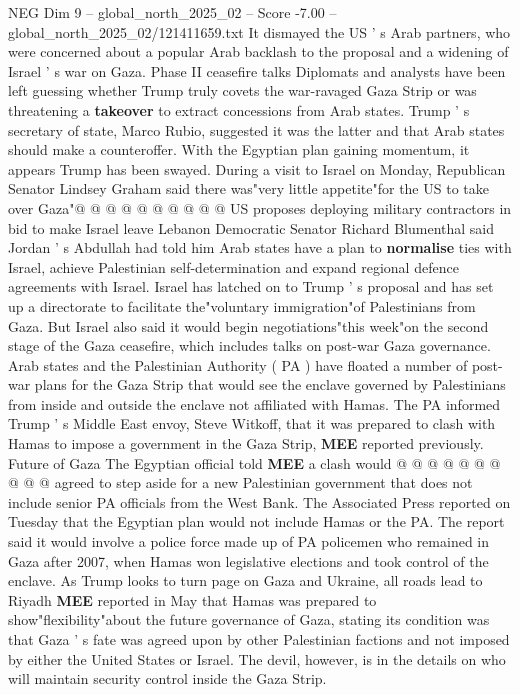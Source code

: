 \begin{textsample}{NEG Dim 9 – global\_north\_2025\_02 – Score -7.00 – global\_north\_2025\_02/121411659.txt}
It dismayed the US ' s Arab partners, who were concerned about a popular Arab backlash to the proposal and a widening of Israel ' s war on Gaza.
Phase II ceasefire talks Diplomats and analysts have been left guessing whether Trump truly covets the war-ravaged Gaza Strip or was threatening a \textbf{takeover} to extract concessions from Arab states.
Trump ' s secretary of state, Marco Rubio, suggested it was the latter and that Arab states should make a counteroffer.
With the Egyptian plan gaining momentum, it appears Trump has been swayed.
During a visit to Israel on Monday, Republican Senator Lindsey Graham said there was"very little appetite"for the US to take over Gaza"@ @ @ @ @ @ @ @ @ @ US proposes deploying military contractors in bid to make Israel leave Lebanon Democratic Senator Richard Blumenthal said Jordan ' s Abdullah had told him Arab states have a plan to \textbf{normalise} ties with Israel, achieve Palestinian self-determination and expand regional defence agreements with Israel.
Israel has latched on to Trump ' s proposal and has set up a directorate to facilitate the"voluntary immigration"of Palestinians from Gaza.
But Israel also said it would begin negotiations"this week"on the second stage of the Gaza ceasefire, which includes talks on post-war Gaza governance.
Arab states and the Palestinian Authority ( PA ) have floated a number of post-war plans for the Gaza Strip that would see the enclave governed by Palestinians from inside and outside the enclave not affiliated with Hamas.
The PA informed Trump ' s Middle East envoy, Steve Witkoff, that it was prepared to clash with Hamas to impose a government in the Gaza Strip, \textbf{MEE} reported previously.
Future of Gaza The Egyptian official told \textbf{MEE} a clash would @ @ @ @ @ @ @ @ @ @ agreed to step aside for a new Palestinian government that does not include senior PA officials from the West Bank.
The Associated Press reported on Tuesday that the Egyptian plan would not include Hamas or the PA.
The report said it would involve a police force made up of PA policemen who remained in Gaza after 2007, when Hamas won legislative elections and took control of the enclave.
As Trump looks to turn page on Gaza and Ukraine, all roads lead to Riyadh \textbf{MEE} reported in May that Hamas was prepared to show"flexibility"about the future governance of Gaza, stating its condition was that Gaza ' s fate was agreed upon by other Palestinian factions and not imposed by either the United States or Israel.
The devil, however, is in the details on who will maintain security control inside the Gaza Strip.

\end{textsample}
